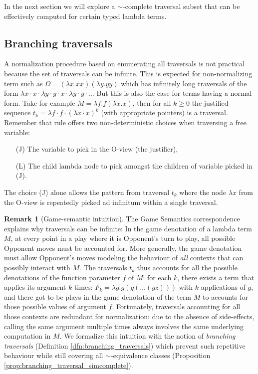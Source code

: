 \documentclass{article}
\theoremstyle{definition}
\newtheorem{remark}{Remark}[section]
\begin{document}
In the next section we will explore a $\sim$-complete traversal subset that can be effectively computed for certain typed lambda terms.

\subsection{Branching traversals}

A normalization procedure based on enumerating all traversals is not practical because the set of traversals can be infinite. This is expected for non-normalizing term such as $\Omega = (\lambda x. x x)(\lambda y. y y)$ which has infinitely long traversals of the form $\lambda x \cdot x \cdot \lambda y \cdot y \cdot x \cdot \lambda y \cdot y \cdot \ldots$ But this is also the case for terms having a normal form. Take for example $M = \lambda f . f (\lambda x. x)$, then for all $k\geq0$ the justified sequence $t_k = \lambda f \cdot f \cdot (\lambda x \cdot  x)^k$ (with appropriate pointers) is a traversal.
Remember that rule  offers two non-deterministic choices when traversing a free variable:
\begin{itemize}
\item[(J)] The variable to pick in the O-view (the justifier),
\item[(L)] The child lambda node to pick amongst the children of variable picked in (J).
\end{itemize}
The choice (J) alone allows the pattern from traversal $t_k$ where the node $\lambda x$ from the O-view is repeatedly picked ad infinitum within a single traversal.

\begin{remark}[Game-semantic intuition]
The Game Semantics correspondence explains why traversals can be infinite: In the game denotation of a lambda term $M$, at every point in a play where it is Opponent's turn to play, all possible Opponent moves must be accounted for. More generally, the game denotation must allow Opponent's moves modeling the behaviour of \emph{all} contexts that can possibly interact with $M$. The traversals $t_k$ thus accounts for all the possible denotations of the function parameter $f$ of $M$: for each $k$, there exists a term that applies its argument $k$ times: $F_k = \lambda g . g (g ( \ldots (g z)))$ with $k$ applications of $g$, and there got to be plays in the game denotation of the term $M$ to accounts for those possible values of argument $f$. Fortunately, traversals accounting for all those contexts are redundant for normalization: due to the absence of side-effects, calling the same argument multiple times always involves the same underlying computation in $M$. We formalize this intuition with the notion of \emph{branching traversals} (Definition \ref{dfn:branching_traversals})  which prevent such repetitive behaviour while still covering all $\sim$-equivalence classes (Proposition \ref{prop:branching_traversal_simcomplete}).
\end{remark}
\end{document}
